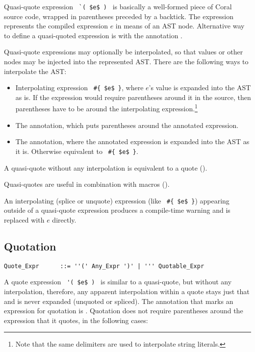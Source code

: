 Quasi-quote expression ~\lstinline!`( $e$ )!~ is basically a well-formed piece of Coral source code, wrapped in parentheses preceded by a backtick. The expression represents the compiled expression $e$ in means of an AST node. Alternative way to define a quasi-quoted expression is with the annotation .

Quasi-quote expressions may optionally be interpolated, so that values or other nodes may be injected into the represented AST. There are the following ways to interpolate the AST:
\begin{itemize}
  \item Interpolating expression ~\lstinline!#{ $e$ }!, where $e$'s value is expanded into the AST as is. If the expression would require parentheses around it in the source, then parentheses have to be around the interpolating expression.\footnote{Note that the same delimiters are used to interpolate string literals.}
  \item The  annotation, which puts parentheses around the annotated expression.
  \item The  annotation, where the annotated expression is expanded into the AST as it is. Otherwise equivalent to ~\lstinline!#{ $e$ }!.
\end{itemize}

A quasi-quote without any interpolation is equivalent to a quote (). 

Quasi-quotes are useful in combination with macros (). 

An interpolating (splice or unquote) expression (like ~\lstinline!#{ $e$ }!) appearing outside of a quasi-quote expression produces a compile-time warning and is replaced with $e$ directly. 





\subsection{Quotation}
\label{sec:quotation}

\syntax\begin{lstlisting}
Quote_Expr      ::= ''(' Any_Expr ')' | ''' Quotable_Expr
\end{lstlisting}

A quote expression ~\lstinline!'( $e$ )!~ is similar to a quasi-quote, but without any interpolation, therefore, any apparent interpolation within a quote stays just that and is never expanded (unquoted or spliced). The annotation that marks an expression for quotation is . Quotation does not require parentheses around the expression that it quotes, in the following cases:

